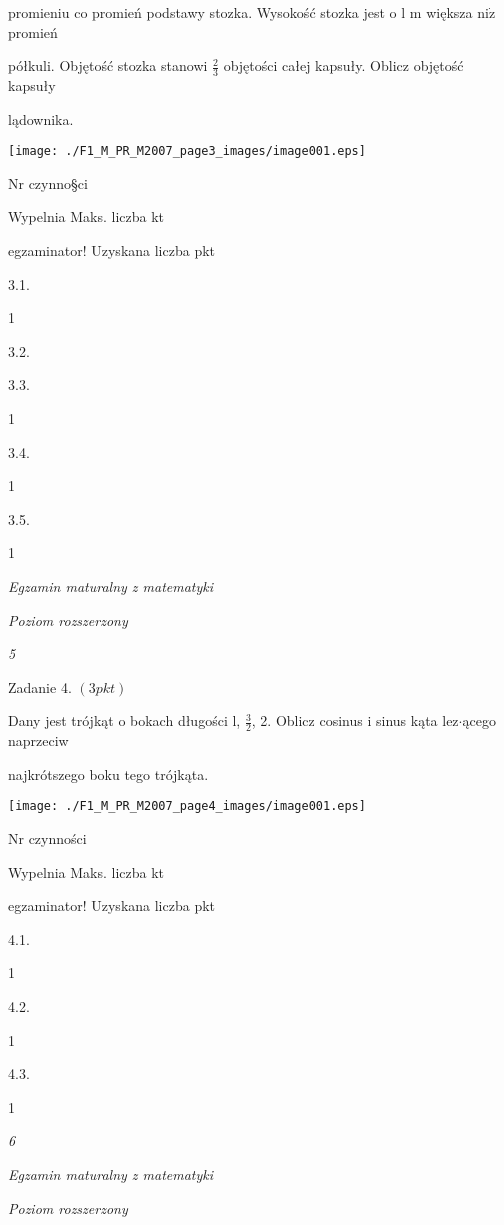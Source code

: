 \documentclass[a4paper,12pt]{article}
\begin{document}
promieniu co promień podstawy stozka. Wysokość stozka jest o l $\mathrm{m}$ większa $\mathrm{n}\mathrm{i}\dot{\mathrm{z}}$ promień

półkuli. Objętość stozka stanowi $\displaystyle \frac{2}{3}$ objętości całej kapsuły. Oblicz objętość kapsuły

lądownika.
\begin{center}
\texttt{[image: ./F1\_M\_PR\_M2007\_page3\_images/image001.eps]}
\end{center}
Nr czynno\S ci

Wypelnia Maks. liczba kt

egzaminator! Uzyskana liczba pkt

3.1.

1

3.2.

3.3.

1

3.4.

1

3.5.

1





{\it Egzamin maturalny z matematyki}

{\it Poziom rozszerzony}

{\it 5}

Zadanie 4. $(3pkt)$

Dany jest trójkąt o bokach długości l, $\displaystyle \frac{3}{2}$, 2. Oblicz cosinus i sinus kąta lez$\cdot$ącego naprzeciw

najkrótszego boku tego trójkąta.
\begin{center}
\texttt{[image: ./F1\_M\_PR\_M2007\_page4\_images/image001.eps]}
\end{center}
Nr czynności

Wypelnia Maks. liczba kt

egzaminator! Uzyskana liczba pkt

4.1.

1

4.2.

1

4.3.

1





{\it 6}

{\it Egzamin maturalny z matematyki}

{\it Poziom rozszerzony}
\end{document}
